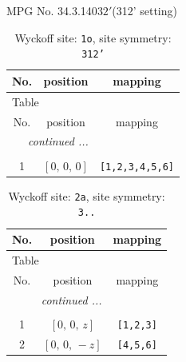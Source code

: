 \documentclass[fleqn,8pt]{jsarticle}
\begin{document}
\setcounter{MaxMatrixCols}{32}

\renewcommand{\tablename}{Table~}
\renewcommand{\figurename}{Figure~}
\begin{center}
\LARGE
MPG No. 34.3.140\quad$32'$\quad(312' setting)
\end{center}
\renewcommand{\arraystretch}{1.2}
\begin{longtable}{ccc}
\caption{Wyckoff site: {\tt 1o}, site symmetry: {\tt 312'}}
 \\
 \hline \hline
No. & position & mapping \\ \hline \endfirsthead

\multicolumn{2}{l}{\tablename\ \thetable{}} \\
 \hline \hline
No. & position & mapping \\ \hline \endhead

 \hline \hline
\multicolumn{2}{r}{\footnotesize\it continued ...} \\ \endfoot

 \hline \hline
\multicolumn{2}{r}{} \\ \endlastfoot

1 & $\left[ 0,\, 0,\, 0 \right]$ & {\tt [1,2,3,4,5,6]} \\
\end{longtable}
\renewcommand{\arraystretch}{1.2}
\begin{longtable}{ccc}
\caption{Wyckoff site: {\tt 2a}, site symmetry: {\tt 3..}}
 \\
 \hline \hline
No. & position & mapping \\ \hline \endfirsthead

\multicolumn{2}{l}{\tablename\ \thetable{}} \\
 \hline \hline
No. & position & mapping \\ \hline \endhead

 \hline \hline
\multicolumn{2}{r}{\footnotesize\it continued ...} \\ \endfoot

 \hline \hline
\multicolumn{2}{r}{} \\ \endlastfoot

1 & $\left[ 0,\, 0,\, z \right]$ & {\tt [1,2,3]} \\ \hline
2 & $\left[ 0,\, 0,\, - z \right]$ & {\tt [4,5,6]} \\
\end{longtable}
\renewcommand{\arraystretch}{1.2}
\end{document}
